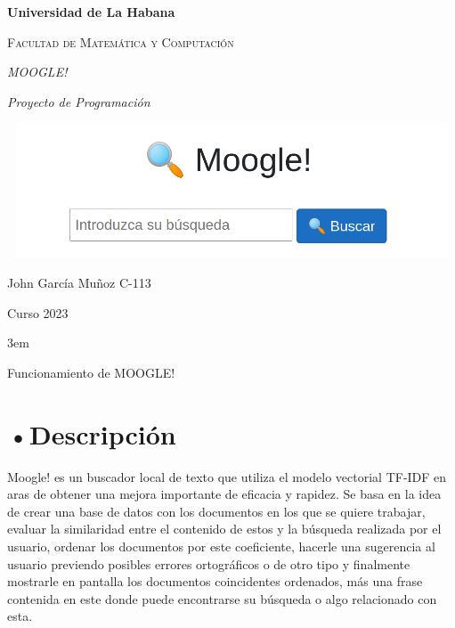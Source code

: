 \documentclass[aspectratio = 169, 14pt]{article}
\date{}
\begin{document}
\begin{titlepage}
\centering
{\bfseries\LARGE Universidad de La Habana}
\vspace{1cm}\\
{\scshape\Large Facultad de Matemática y Computación \par}
\vspace{2cm}
{\scshape\Huge\textit {MOOGLE!} \par}
\vspace{1cm}
{\itshape\Large Proyecto de Programación \par}
\vspace{4cm}
\includegraphics[width=15cm, height=4cm]{moogle.png}
\vfill
{\Large John García Muñoz C-113 \par}
{\Large Curso 2023 \par}
\end{titlepage}
\pagestyle{headings}
\parskip 3em
\begin{center}
\end{center}
\begin{flushleft}
\begin{Huge}
Funcionamiento de MOOGLE!
\end{Huge}
\setcounter{secnumdepth}{1}
\section{•Descripción}

\end{flushleft}
\begin{Large}
Moogle! es un buscador local de texto que
utiliza el modelo vectorial TF-IDF en aras de
obtener una mejora importante de eficacia y
rapidez. Se basa en la idea de crear una base
de datos con los documentos en los que se
quiere trabajar, evaluar la similaridad entre el
contenido de estos y la búsqueda realizada por
el usuario, ordenar los documentos por este
coeficiente, hacerle una sugerencia al usuario
previendo posibles errores ortográficos o de otro tipo
y finalmente mostrarle en pantalla los
documentos coincidentes ordenados, más una
frase contenida en este donde puede
encontrarse su búsqueda o algo relacionado
con esta.

\end{Large}
\end{document}
